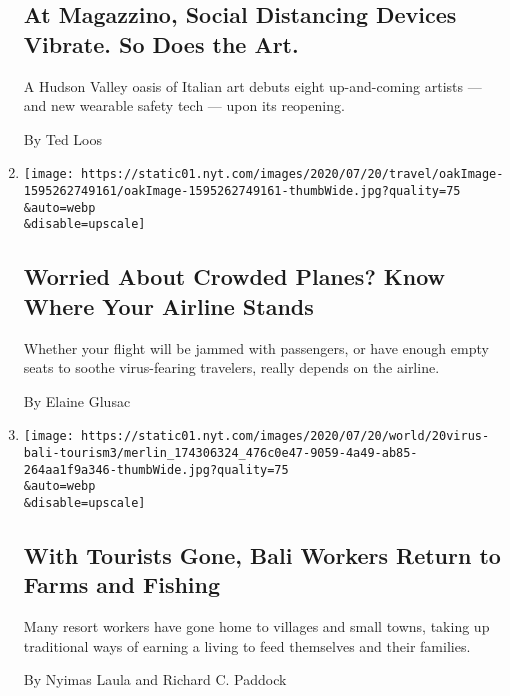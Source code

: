 \begin{enumerate}
  \hypertarget{at-magazzino-social-distancing-devices-vibrate-so-does-the-art}{%
  \subsection{At Magazzino, Social Distancing Devices Vibrate. So Does
  the
  Art.}\label{at-magazzino-social-distancing-devices-vibrate-so-does-the-art}}

  A Hudson Valley oasis of Italian art debuts eight up-and-coming
  artists --- and new wearable safety tech --- upon its reopening.

  By Ted Loos
\item
  \href{/2020/07/21/travel/crowded-flights-coronavirus.html}{}

  \texttt{[image: https://static01.nyt.com/images/2020/07/20/travel/oakImage-1595262749161/oakImage-1595262749161-thumbWide.jpg?quality=75\\\&auto=webp\\\&disable=upscale]}

  \hypertarget{worried-about-crowded-planes-know-where-your-airline-stands}{%
  \subsection{Worried About Crowded Planes? Know Where Your Airline
  Stands}\label{worried-about-crowded-planes-know-where-your-airline-stands}}

  Whether your flight will be jammed with passengers, or have enough
  empty seats to soothe virus-fearing travelers, really depends on the
  airline.

  By Elaine Glusac
\item
  \href{/2020/07/20/world/asia/bali-tourism-coronavirus.html}{}

  \texttt{[image: https://static01.nyt.com/images/2020/07/20/world/20virus-bali-tourism3/merlin\_174306324\_476c0e47-9059-4a49-ab85-264aa1f9a346-thumbWide.jpg?quality=75\\\&auto=webp\\\&disable=upscale]}

  \hypertarget{with-tourists-gone-bali-workers-return-to-farms-and-fishing}{%
  \subsection{With Tourists Gone, Bali Workers Return to Farms and
  Fishing}\label{with-tourists-gone-bali-workers-return-to-farms-and-fishing}}

  Many resort workers have gone home to villages and small towns, taking
  up traditional ways of earning a living to feed themselves and their
  families.

  By Nyimas Laula and Richard C. Paddock
\end{enumerate}

